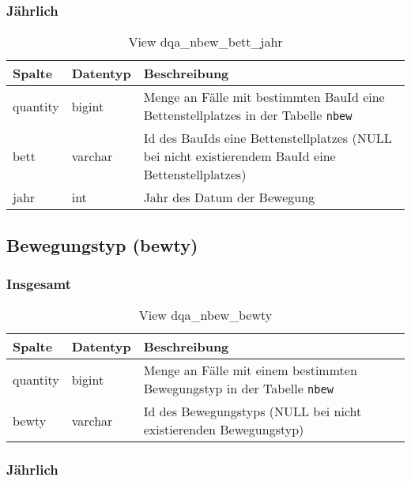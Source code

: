 \subsubsection{Jährlich} \label{subsubsec:bettJ}

\begin{table}[ht]
	\centering   
	\caption{View dqa\_nbew\_bett\_jahr}
	\label{tab:beweBettJahr}
	\begin{tabular}{||l|l|p{10cm}||}   		
		\hline
		Spalte & Datentyp & Beschreibung \\ [0.5ex]
		\hline\hline
		quantity & bigint & Menge an Fälle mit bestimmten BauId eine Bettenstellplatzes in der Tabelle \texttt{nbew} \\
		\hline
		bett & varchar &  Id des BauIds eine Bettenstellplatzes (NULL bei nicht existierendem BauId eine Bettenstellplatzes) \\
		\hline
		jahr & int &  Jahr des Datum der Bewegung \\
		\hline		
	\end{tabular}
\end{table}

\subsection{Bewegungstyp (bewty)} \label{subsec:bewtyp}

\subsubsection{Insgesamt} \label{subsubsec:bewtypI}

\begin{table}[ht]
	\centering   
	\caption{View dqa\_nbew\_bewty}
	\label{tab:bewBtyI}
	\begin{tabular}{||l|l|p{10cm}||}   		
		\hline
		Spalte & Datentyp & Beschreibung \\ [0.5ex]
		\hline\hline
		quantity & bigint & Menge an Fälle mit einem bestimmten Bewegungstyp in der Tabelle \texttt{nbew} \\
		\hline
		bewty & varchar & Id des Bewegungstyps (NULL bei nicht existierenden Bewegungstyp)\\
		\hline
		
	\end{tabular}
\end{table}

\subsubsection{Jährlich} \label{subsubsec:bewtypJ}


